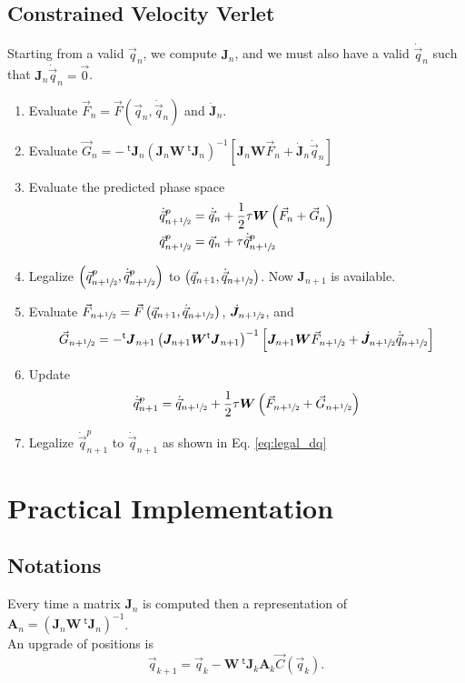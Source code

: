 \documentclass[aps,twocolumn]{revtex4}
\newcommand{\mymat}[1]{\boldsymbol{#1}}
\newcommand{\mytrn}[1]{{\!\!~^{\mathsf{t}}{#1}}}
\newcommand{\half}{\sfrac{1}{2}}
\newcommand{\q}{\vec{q}}
\newcommand{\dq}{\dot{\q}}
\newcommand{\C}{\vec{C}}
\newcommand{\J}{\mymat{J}}
\newcommand{\dJ}{\dot{\J}}
\newcommand{\tJ}{\mytrn{\J}}
\newcommand{\G}{\vec{G}}
\newcommand{\W}{\mymat{W}}
\newcommand{\A}{\mymat{A}}
\begin{document}
\subsection{Constrained Velocity Verlet}

Starting from a valid $\q_n$, we compute $\J_n$, and we must also have a valid $\dq_n$ such that $\J_n\dq_n=\vec{0}$.

\begin{enumerate}
	\item Evaluate $\vec{F}_n = \vec{F}(\q_n,\dq_n)$ and $\dJ_n$.
	\item Evaluate $\G_n = -\tJ_n \left(\J_n \W \tJ_n \right)^{-1}\left\lbrack \J_n\W\vec{F}_n + \dJ_n \dq_n \right\rbrack$
	\item Evaluate the predicted phase space
	\begin{align*}
	\dq_{n+\half}^p & = \dq_n + \frac{1}{2} \tau \W \left(\vec{F}_n + \G_n \right) \\
	\q_{n+\half}^p  & = \q_{n} + \tau \dq_{n+\half}^p
	\end{align*}
	\item Legalize $\left(\q_{n+\half}^p,\dq_{n+\half}^p\right)$ to $\left(\q_{n+1},\dq_{n+\half}\right)$. Now $\J_{n+1}$ is available.
	\item Evaluate $\vec{F}_{n+\half}=\vec{F}\left(\q_{n+1},\dq_{n+\half}\right)$, $\dJ_{n+\half}$, 
	and 
	$$
	\G_{n+\half}=-\tJ_{n+1} \left(\J_{n+1} \W \tJ_{n+1} \right)^{-1}\left\lbrack \J_{n+1}\W\vec{F}_{n+\half} + \dJ_{n+\half} \dq_{n+\half} \right\rbrack
	$$
	\item Update
	$$
		\dq_{n+1}^{p} = \dq_{n+\half} + \frac{1}{2} \tau \W\left(\vec{F}_{n+\half} + \vec{G}_{n+\half}\right)
	$$
	\item Legalize $\dq_{n+1}^{p}$ to $\dq_{n+1}$ as shown in Eq. \eqref{eq:legal_dq}
\end{enumerate}

\section{Practical Implementation}

\subsection{Notations}
Every time a matrix $\J_n$ is computed then  a representation of $\A_n = \left(\J_n \W\tJ_n\right)^{-1}$.\\

An upgrade of positions is
$$
	\q_{k+1} = \q_{k} - \W \tJ_k  \A_{k} \C\left(\q_{k}\right).
$$
\end{document}
